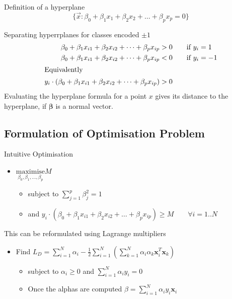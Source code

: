 \documentclass[11pt]{article}
\theoremstyle{definition}
\begin{document}
\begin{definition}
	Definition of a hyperplane
	\begin{equation*}
		\{ \vec{x}: \beta_0 + \beta_1 x_1 + \beta_2 x_2 + \dots + \beta_p x_p = 0 \}
	\end{equation*}
\end{definition}
Separating hyperrplanes for classes encoded $\pm 1$
\begin{align*}
	\beta_0 + \beta_1 x_{i1} + \beta_2 x_{i2} + \dots + \beta_p x_{ip} &> 0 \qquad \text{if}\ y_i = 1\\
	\beta_0 + \beta_1 x_{i1} + \beta_2 x_{i2} + \dots + \beta_p x_{ip} &< 0 \qquad \text{if}\ y_i = -1\\
	\intertext{Equivalently}
	y_i\cdot (\beta_0 + \beta_1 x_{i1} + \beta_2 x_{i2} + \dots + \beta_p x_{ip}) &> 0
\end{align*}
Evaluating the hyperplane formula for a point $x$ gives its distance to the hyperplane, if $\bm{\beta}$ is a normal vector.

\subsection{Formulation of Optimisation Problem}
Intuitive Optimisation
\begin{itemize}[noitemsep]
	\item $\underset{\beta_0,\beta_1,\dots,\beta_p}{\text{maximise}} M$
	\begin{itemize}
		\item subject to $\sum_{j=1}^{p}\beta_j^2 = 1$
		\item and $y_i\cdot (\beta_0 + \beta_1 x_{i1} + \beta_2 x_{i2} + \dots + \beta_p x_{ip}) \geq M\qquad\forall i = 1..N$
	\end{itemize}
\end{itemize}
This can be reformulated using {\color{DodgerBlue2} Lagrange multipliers}
\begin{itemize}[noitemsep]
	\item Find $L_D = \sum_{i=1}^{N} \alpha_i - \frac{1}{2} \sum_{i=1}^{N}\left( \sum_{k=1}^{N} \alpha_i \alpha_k \bm{x}_i^T \bm{x}_k \right) $
		\begin{itemize}
		\item subject to $ \alpha_i \geq 0 $ and $\sum_{i=1}^{N} \alpha_i y_i = 0$
		\item Once the alphas are computed $\beta = \sum_{i=1}^{N} \alpha_i y_i \bm{x}_i$
	\end{itemize}
\end{itemize}
\end{document}
